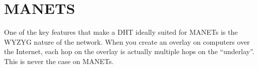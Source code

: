 \documentclass[10pt,letterpaper]{report}
\begin{document}
\chapter{MANETS}
One of the key features that make a DHT ideally suited for MANETs is the WYZYG nature of the network.  When you create an overlay on computers over the Internet, each hop on the overlay is actually multiple hops on the ``underlay''.  This is never the case on MANETs.



\end{document}

